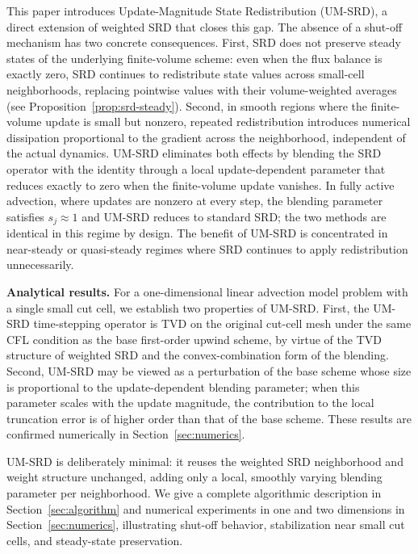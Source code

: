 \documentclass[11pt]{article}
\begin{document}
This paper introduces Update-Magnitude State Redistribution (UM-SRD), a 
direct extension of weighted SRD that closes this gap. The absence of a 
shut-off mechanism has two concrete consequences. First, SRD does not 
preserve steady states of the underlying finite-volume scheme: even when 
the flux balance is exactly zero, SRD continues to redistribute state values 
across small-cell neighborhoods, replacing pointwise values with their 
volume-weighted averages (see Proposition~\ref{prop:srd-steady}). Second, in 
smooth regions where the finite-volume update is small but nonzero, repeated 
redistribution introduces numerical dissipation proportional to the gradient 
across the neighborhood, independent of the actual dynamics. UM-SRD eliminates both effects by blending the SRD operator with the 
identity through a local update-dependent parameter that reduces exactly 
to zero when the finite-volume update vanishes. In fully active advection, 
where updates are nonzero at every step, the blending parameter satisfies 
$s_j \approx 1$ and UM-SRD reduces to standard SRD; the two methods are 
identical in this regime by design. The benefit of UM-SRD is concentrated 
in near-steady or quasi-steady regimes where SRD continues to apply 
redistribution unnecessarily.

\medskip

\noindent\textbf{Analytical results.}
For a one-dimensional linear advection model problem with a single small
cut cell, we establish two properties of UM-SRD. First, the UM-SRD
time-stepping operator is TVD on the original cut-cell mesh under the same
CFL condition as the base first-order upwind scheme, by virtue of the TVD
structure of weighted SRD and the convex-combination form of the blending.
Second, UM-SRD may be viewed as a perturbation of the base scheme whose
size is proportional to the update-dependent blending parameter; when this
parameter scales with the update magnitude, the contribution to the local
truncation error is of higher order than that of the base scheme. These
results are confirmed numerically in Section~\ref{sec:numerics}.

\medskip
UM-SRD is deliberately minimal: it reuses the weighted SRD neighborhood and
weight structure unchanged, adding only a local, smoothly varying blending
parameter per neighborhood. We give a complete algorithmic description in
Section~\ref{sec:algorithm} and numerical experiments in one and two
dimensions in Section~\ref{sec:numerics}, illustrating shut-off behavior,
stabilization near small cut cells, and steady-state preservation.
\end{document}
